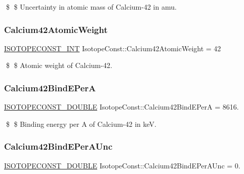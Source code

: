 \$ \$ Uncertainty in atomic mass of Calcium-\/42 in amu. \mbox{\label{group___isotope_const-_calcium-_ca42_ga43336a15e91ec28839a6faa980665d9d}} 
\subsubsection{\texorpdfstring{Calcium42\+Atomic\+Weight}{Calcium42AtomicWeight}}
{\footnotesize\ttfamily \mbox{\hyperlink{group___isotope_const-_macros_ga5f18360b3e99483a35c32d789e62621c}{I\+S\+O\+T\+O\+P\+E\+C\+O\+N\+S\+T\+\_\+\+I\+NT}} Isotope\+Const\+::\+Calcium42\+Atomic\+Weight = 42}

\$ \$ Atomic weight of Calcium-\/42. \mbox{\label{group___isotope_const-_calcium-_ca42_ga639b5e422df54583ac09b3d5d4074cca}} 
\subsubsection{\texorpdfstring{Calcium42\+Bind\+E\+PerA}{Calcium42BindEPerA}}
{\footnotesize\ttfamily \mbox{\hyperlink{group___isotope_const-_macros_ga8f45a7272ce02c0b4c65c44636ed719a}{I\+S\+O\+T\+O\+P\+E\+C\+O\+N\+S\+T\+\_\+\+D\+O\+U\+B\+LE}} Isotope\+Const\+::\+Calcium42\+Bind\+E\+PerA = 8616.}

\$ \$ Binding energy per A of Calcium-\/42 in keV. \mbox{\label{group___isotope_const-_calcium-_ca42_gab502eaafffa78586f2196507aaab1d48}} 
\subsubsection{\texorpdfstring{Calcium42\+Bind\+E\+Per\+A\+Unc}{Calcium42BindEPerAUnc}}
{\footnotesize\ttfamily \mbox{\hyperlink{group___isotope_const-_macros_ga8f45a7272ce02c0b4c65c44636ed719a}{I\+S\+O\+T\+O\+P\+E\+C\+O\+N\+S\+T\+\_\+\+D\+O\+U\+B\+LE}} Isotope\+Const\+::\+Calcium42\+Bind\+E\+Per\+A\+Unc = 0.}


